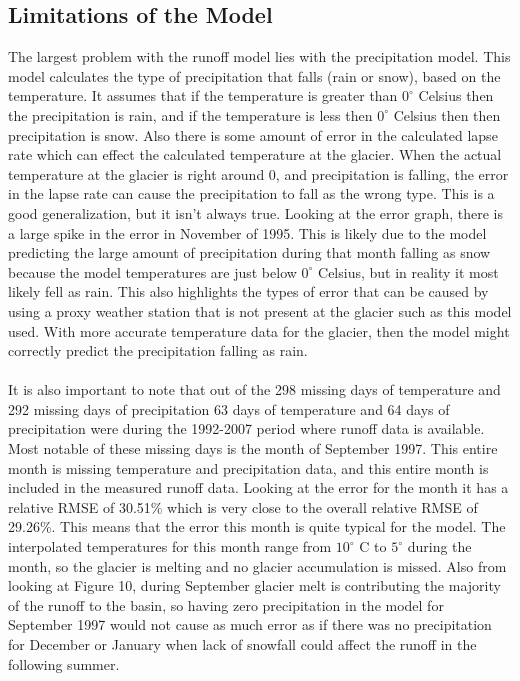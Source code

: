 \documentclass{article}
\begin{document}
\subsection{Limitations of the Model}
The largest problem with the runoff model lies with the precipitation model. This model calculates the type of precipitation that falls (rain or 
snow), based on the temperature. It assumes that if the temperature is greater than $0^\circ$ Celsius then the precipitation is rain, and if the 
temperature is less then $0^\circ$ Celsius then then precipitation is snow. Also there is some amount of error in the calculated lapse rate which 
can effect the calculated temperature at the glacier. When the actual temperature at the glacier is right around 0, and precipitation is falling, 
the error in the lapse rate can cause the precipitation to fall as the wrong type. This is a good generalization, but it isn't always true. Looking at the 
error graph, there is a large spike in the error in November of 1995. This is likely due to the model predicting the large amount of precipitation 
during that month falling as snow because the model temperatures are just below $0^\circ$ Celsius, but in reality it most likely fell as rain. This also 
highlights the types of error that can be caused by using a proxy weather station that is not present at the glacier such as this model used. With 
more accurate temperature data for the glacier, then the model might correctly predict the precipitation falling as rain. 
\paragraph{}
It is also important to note that out of the 298 missing days of temperature and 292 missing days of precipitation 63 days of temperature and 64 
days of precipitation were during the 1992-2007 period where runoff data is available. Most notable of these missing days is the month of September 
1997. This entire month is missing temperature and precipitation data, and this entire month is included in the measured runoff data. Looking at the 
error for the month it has a relative RMSE of 30.51\% which is very close to the overall relative RMSE of 29.26\%. This 
means that the error this month is quite typical for the model. The interpolated temperatures for this month range from $10^\circ$ C to $5^\circ$ 
during the month, so the glacier is melting and no glacier accumulation is missed. Also from looking at Figure 10, during September glacier melt is 
contributing the majority of the runoff to the basin, so having zero precipitation in the model for September 1997 would not cause as much error as 
if there was no precipitation for December or January when lack of snowfall could affect the runoff in the following summer.
\end{document}
